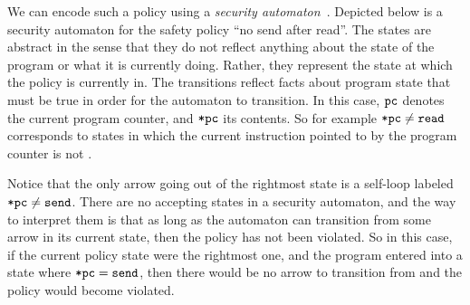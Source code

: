 \documentclass[11pt,twoside]{scrartcl}
\begin{document}
We can encode such a policy using a \emph{security automaton}~\cite{Schneider2000}. Depicted below is a security automaton for the safety policy ``no send after read''. The states are abstract in the sense that they do not reflect anything about the state of the program or what it is currently doing. Rather, they represent the state at which the policy is currently in. The transitions reflect facts about program state that must be true in order for the automaton to transition. In this case, $\texttt{\upshape pc}$ denotes the current program counter, and $\texttt{\upshape *pc}$ its contents. So for example $\texttt{\upshape *pc} \ne \texttt{\upshape read}$ corresponds to states in which the current instruction pointed to by the program counter is not \pread.
\begin{center}
\end{center}
Notice that the only arrow going out of the rightmost state is a self-loop labeled $\texttt{\upshape *pc} \ne \texttt{\upshape send}$. There are no accepting states in a security automaton, and the way to interpret them is that as long as the automaton can transition from some arrow in its current state, then the policy has not been violated. So in this case, if the current policy state were the rightmost one, and the program entered into a state where $\texttt{\upshape *pc} = \texttt{\upshape send}$, then there would be no arrow to transition from and the policy would become violated.
\end{document}
